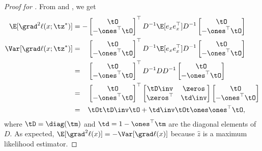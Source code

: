 \begin{proof}[Proof for ]
From  and , we get
  \begin{align*}
    \E[\grad^2 \ell(x; \tz^*)] 
    &= -
        \begin{bmatrix}
          \tO \\
          -\ones^\top \tO
        \end{bmatrix}^\top
          D^{-1} \E[e_x e_x^\top] D^{-1} 
        \begin{bmatrix}
          \tO \\
          -\ones^\top \tO
        \end{bmatrix} \\
    \Var [\grad \ell(x; \tz^*)] 
    &= \hphantom{-}
        \begin{bmatrix}
          \tO \\
          -\ones^\top \tO
        \end{bmatrix}^\top
          D^{-1} \E[e_x e_x^\top] D^{-1} 
        \begin{bmatrix}
          \tO \\
          -\ones^\top \tO
        \end{bmatrix} \\
    &= \hphantom{-}
        \begin{bmatrix}
          \tO \\
          -\ones^\top \tO
        \end{bmatrix}^\top
          D^{-1} D D^{-1} 
        \begin{bmatrix}
          \tO \\
          -\ones^\top \tO
        \end{bmatrix} \\
    &= \hphantom{-}
        \begin{bmatrix}
          \tO \\
          - \ones^\top \tO
        \end{bmatrix}^\top
        \begin{bmatrix}
          \tD\inv & \zeros \\
          \zeros^\top & \td\inv
        \end{bmatrix}
        \begin{bmatrix}
          \tO \\
          - \ones^\top \tO
        \end{bmatrix} \\
        &= \hphantom{-} 
          \tOt \tD\inv \tO + \td\inv \tOt \ones \ones^\top \tO,
  \end{align*}
where $\tD = \diag(\tm)$ and $\td = 1 - \ones^\top \tm$ are the diagonal
  elements of $D$.
As expected, $\E[\grad^2 \ell(x)] = -\Var [\grad \ell(x)]$ because
$\hat{z}$ is a maximum likelihood estimator. 


\end{proof}
